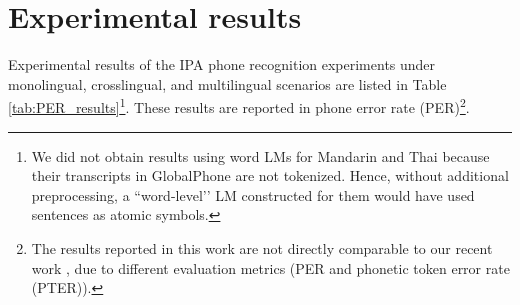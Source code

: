 \documentclass{article}
\begin{document}
\section{Experimental results}

Experimental results of the IPA phone recognition experiments
under monolingual, crosslingual, and multilingual scenarios are listed in Table \ref{tab:PER_results}\footnote{We did not obtain results using word LMs for Mandarin and Thai because their transcripts in GlobalPhone are not tokenized. Hence, without additional preprocessing, a ``word-level’' LM constructed for them would have used sentences as atomic symbols.}. These results are reported in phone error rate (PER)\footnote{The results reported in this work are not directly comparable to our recent work \cite{Zelasko2020That}, due to different evaluation metrics (PER and phonetic token error rate (PTER)).}.







\end{document}

